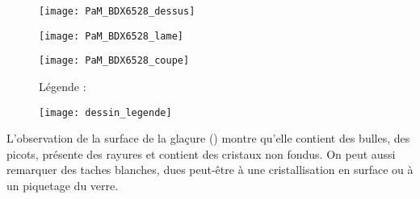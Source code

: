 \begin{figure}[htb]
  \begin{minipage}[t]{0.5\textwidth}
    \centerfloat
    \vspace*{0pt}
    \texttt{[image: PaM\_BDX6528\_dessus]}
  \end{minipage}%
  \quad%
  \begin{minipage}[t]{0.5\textwidth}
    \centerfloat
    \vspace*{0pt}
    \texttt{[image: PaM\_BDX6528\_lame]}
  \end{minipage}

  \bigskip

  \begin{minipage}[t]{0.5\textwidth}
    \centerfloat
    \vspace*{0pt}
    \texttt{[image: PaM\_BDX6528\_coupe]}
  \end{minipage}%
  \quad%
  \begin{minipage}[t]{0.5\textwidth}
    \vspace*{0pt}
    Légende :

    \texttt{[image: dessin\_legende]}
  \end{minipage}
  \caption[]{\legendeA 
          }
  \label{dessin:6528}
\end{figure}

L'observation de la surface de la glaçure () montre 
qu'elle contient des bulles, des picots, présente des rayures et 
contient des cristaux non fondus. On peut aussi remarquer des taches 
blanches, dues peut-être à une cristallisation en surface ou à un 
piquetage du verre.

